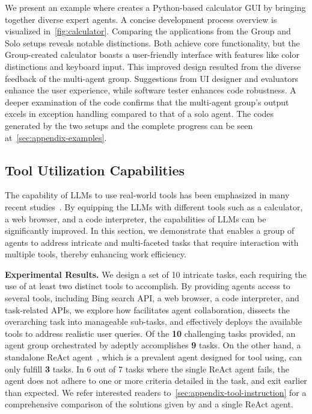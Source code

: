 
We present an example where \framework creates a Python-based calculator GUI by bringing together diverse expert agents. A concise development process overview is visualized in~\cref{fig:calculator}. 
Comparing the applications from the Group and Solo setups reveals notable distinctions. Both achieve core functionality, but the Group-created calculator boasts a user-friendly interface with features like color distinctions and keyboard input. This improved design resulted from the diverse feedback of the multi-agent group. Suggestions from UI designer and evaluators enhance the user experience, while software tester enhances code robustness. A deeper examination of the code confirms that the multi-agent group's output excels in exception handling compared to that of a solo agent. The codes generated by the two setups and the complete progress can be seen at~\cref{sec:appendix-examples}.








\subsection{Tool Utilization Capabilities}
\label{sec:experiment-tool}

The capability of LLMs to use real-world tools has been emphasized in many recent studies~\citep{DBLP:journals/corr/abs-2302-04761,qin2023tool}. By equipping the LLMs with different tools such as a calculator, a web browser, and a code interpreter, the capabilities of LLMs can be significantly improved. In this section, we demonstrate that \framework enables a group of agents to address intricate and multi-faceted tasks that require interaction with multiple tools, thereby enhancing work efficiency.

\textbf{Experimental Results.}
\label{sec:experiment-tool-result}
We design a set of 10 intricate tasks, each requiring the use of at least two distinct tools to accomplish. By providing agents access to several tools, including Bing search API, a web browser, a code interpreter, and task-related APIs, we explore how \framework facilitates agent collaboration, dissects the overarching task into manageable sub-tasks, and effectively deploys the available tools to address realistic user queries.
Of the \textbf{10} challenging tasks provided, an agent group orchestrated by \framework adeptly accomplishes \textbf{9} tasks. On the other hand, a standalone ReAct agent~\citep{yao2023react}, which is a prevalent agent designed for tool using, can only fulfill \textbf{3} tasks. In 6 out of 7 tasks where the single ReAct agent fails, the agent does not adhere to one or more criteria detailed in the task, and exit earlier than expected. We refer interested readers to~\cref{sec:appendix-tool-instruction} for a comprehensive comparison of the solutions given by \framework and a single ReAct agent.

